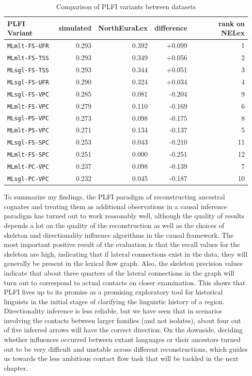 \begin{table}
 \centering
 \begin{tabular}{lrrrr}
\hline \hline
PLFI Variant & simulated & NorthEuraLex & difference & rank on NELex\\ \hline
\texttt{MLmlt-FS-UFR} & 0.293 & 0.392 & +0.099 & 1\\  
\texttt{MLmlt-FS-TSS} & 0.293 & 0.349 & +0.056 & 2\\
\texttt{MLsgl-FS-TSS} & 0.293 & 0.344 & +0.051 & 3\\
\texttt{MLsgl-FS-UFR} & 0.290 & 0.324 & +0.034 & 4\\
\texttt{MLsgl-FS-VPC} & 0.285 & 0.081 & -0.204 & 9\\
\texttt{MLmlt-FS-VPC} & 0.279 & 0.110 & -0.169 & 6\\
\texttt{MLsgl-PS-VPC} & 0.273 & 0.098 & -0.175 & 8\\
\texttt{MLmlt-PS-VPC} & 0.271 & 0.134 & -0.137 & 5\\
\texttt{MLsgl-FS-SPC} & 0.253 & 0.043 & -0.210 & 11\\
\texttt{MLmlt-FS-SPC} & 0.251 & 0.000 & -0.251 & 12\\
\texttt{MLmlt-PC-VPC} & 0.237 & 0.098 & -0.139 & 7\\
\texttt{MLsgl-PC-VPC} & 0.232 & 0.045 & -0.187 & 10\\
  \hline
 \end{tabular}
 \caption{Comparison of PLFI variants between datasets}
 \label{variant-comparison-simulated-and-nelex}
\end{table}

To summarize my findings, the PLFI paradigm of reconstructing ancestral cognates and treating them as additional observations in a causal inference paradigm has turned out to work reasonably well, although the quality of results depends a lot on the quality of the reconstruction as well as the choices of skeleton and directionality influence algorithms in the causal framework. The most important positive result of the evaluation is that the recall values for the skeleton are high, indicating that if lateral connections exist in the data, they will generally be present in the lexical flow graph. Also, the skeleton precision values indicate that about three quarters of the lateral connections in the graph will turn out to correspond to actual contacts on closer examination. This shows that PLFI lives up to its promise as a promising exploratory tool for historical linguists in the initial stages of clarifying the linguistic history of a region. Directionality inference is less reliable, but we have seen that in scenarios involving the contacts between larger families (and not isolates), about four out of five inferred arrows will have the correct direction. On the downside, deciding whether influences occurred between extant languages or their ancestors turned out to be very difficult and unstable across different reconstructions, which guides us towards the less ambitious contact flow task that will be tackled in the next chapter.
